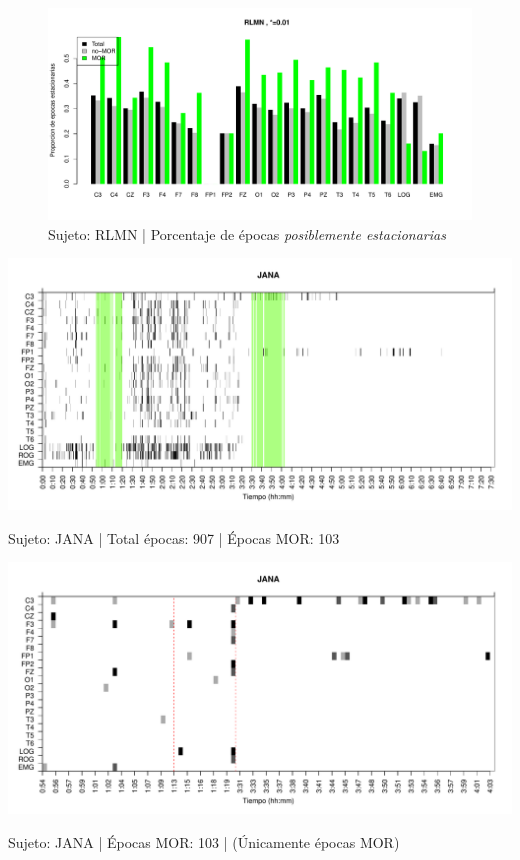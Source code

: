 \begin{figure}
\centering
\includegraphics[width=\linewidth]
{./material_bonito170220/porcentaje_bis/RLMN10SUE_99_846_1_bar_porcentaje.pdf} 
\caption{Sujeto: RLMN | Porcentaje de \'epocas \textit{posiblemente estacionarias}}
\end{figure}


\begin{SidewaysFigure}
\centering
\includegraphics[width=\linewidth]
{./material_bonito170220/JANASUE_103_mor103_tot907_est_total.pdf} 
\caption{Sujeto: JANA | Total \'epocas: 907 | \'Epocas MOR: 103}
\end{SidewaysFigure}
\begin{SidewaysFigure}
\centering
\includegraphics[width=\linewidth]
{./material_bonito170220/JANASUE_103_mor103_tot103_est_mor.pdf} 
\caption{Sujeto: JANA | \'Epocas MOR: 103 | (\'Unicamente \'epocas MOR)}
\end{SidewaysFigure}

